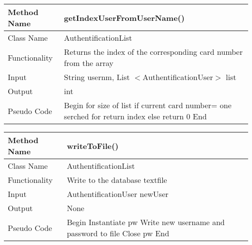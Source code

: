 \documentclass{article}
\newcommand\tab[1][1cm]{\hspace*{#1}}
\begin{document}
\begin{center}
\begin{tabular}{|p{2.5cm}||p{10cm}|}
\hline
Method Name & getIndexUserFromUserName() \\
\hline
Class Name & AuthentificationList \\
\hline
Functionality & Returns the index of the corresponding card number from the array\\
\hline

Input & String usernm, List $<$AuthentificationUser$>$ list\\
\hline
Output & int\\
\hline

Pseudo Code & Begin\newline
\tab for size of list\newline
\tab \tab if current card number= one serched for\newline
\tab \tab \tab return index\newline
\tab else return 0\newline
End \\
\hline
\end{tabular}
\end{center}

\begin{center}
\begin{tabular}{|p{2.5cm}||p{10cm}|}
\hline
Method Name & writeToFile() \\
\hline
Class Name & AuthentificationList \\
\hline
Functionality & Write to the database textfile\\
\hline

Input & AuthentificationUser newUser\\
\hline
Output & None\\
\hline

Pseudo Code & Begin\newline
\tab Instantiate pw\newline
\tab Write new username and password to file\newline
\tab Close pw\newline
End \\
\hline
\end{tabular}
\end{center}
\end{document}
